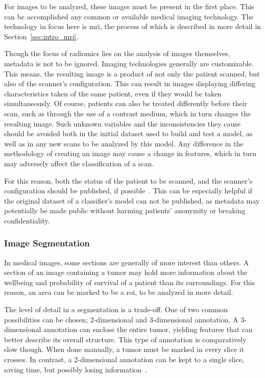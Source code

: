 For images to be analyzed, these images must be present in the first place. This can
be accomplished any common or available medical imaging technology. The technology in focus here is \ac{mri}, the process of which is 
described in more detail in Section~\ref{sec:intro_mri}.

Though the focus of radiomics lies on the analysis of images 
themselves, metadata is not to be ignored. Imaging technologies generally are 
customizable. This means, the resulting image is a product of not only the 
patient scanned, but also of the scanner's configuration. This can result in 
images displaying differing characteristics taken of the same patient, even if 
they would be taken simultaneously. Of course, patients can also be treated 
differently before their scan, such as through the use of a contrast medium, 
which in turn changes the resulting image. Such unknown variables and the 
inconsistencies they cause should be avoided both in the initial dataset used to
build and test a model, as well as in any new scans to be analyzed by this model. 
Any difference in the methodology of creating an image may cause a change in 
features, which in turn may adversely affect the classification of a scan.

For this reason, both the status of the patient to be scanned, and the 
scanner's configuration should be published, if possible~\cite{radiomics_score}. 
This can be especially helpful if the original dataset of a classifier's model 
can not be published, as metadata may potentially be made public without harming
patients' anonymity or breaking confidentiality.

\subsubsection{Image Segmentation}\label{sec:radiomics_image_segmentation}

In medical images, some sections are generally of more interest than others. A 
section of an image containing a tumor may hold more information about the 
wellbeing and probability of survival of a patient than its surroundings. For 
this reason, an area can be marked to be a \acf{roi}, to be analyzed in more 
detail. 

The level of detail in a segmentation is a trade-off. One of two common 
possibilities can be chosen; 2-dimensional and 3-dimensional annotation. 
A 3-dimensional annotation can enclose the entire tumor, yielding features
that can better describe its overall structure. This type of annotation is 
comparatively slow though. When done manually, a tumor must be marked in every
slice it crosses. In contrast, a 2-dimensional annotation can be kept to a 
single slice, saving time, but possibly losing 
information~\cite{auto_and_semiauto,whole_tumor_vs_cross_section}.

